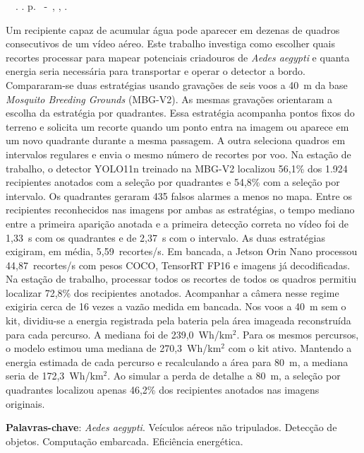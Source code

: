 \setlength{\absparsep}{18pt} %
\begin{resumo}
	\begin{flushleft}
			\setlength{\absparsep}{0pt} %
			\SingleSpacing
			\imprimirautorabr~~\textbf{\imprimirtituloresumo}.	\imprimirdata. \pageref{LastPage} p.
			\imprimirtipotrabalho~-~\imprimirinstituicao, \imprimirlocal, \imprimirdata.
 	\end{flushleft}
\OnehalfSpacing
Um recipiente capaz de acumular água pode aparecer em dezenas de quadros consecutivos de um vídeo aéreo. Este trabalho investiga como escolher quais recortes processar para mapear potenciais criadouros de \textit{Aedes aegypti} e quanta energia seria necessária para transportar e operar o detector a bordo. Compararam-se duas estratégias usando gravações de seis voos a 40~m da base \textit{Mosquito Breeding Grounds} (MBG-V2). As mesmas gravações orientaram a escolha da estratégia por quadrantes. Essa estratégia acompanha pontos fixos do terreno e solicita um recorte quando um ponto entra na imagem ou aparece em um novo quadrante durante a mesma passagem. A outra seleciona quadros em intervalos regulares e envia o mesmo número de recortes por voo. Na estação de trabalho, o detector YOLO11n treinado na MBG-V2 localizou 56,1\% dos 1.924 recipientes anotados com a seleção por quadrantes e 54,8\% com a seleção por intervalo. Os quadrantes geraram 435 falsos alarmes a menos no mapa. Entre os recipientes reconhecidos nas imagens por ambas as estratégias, o tempo mediano entre a primeira aparição anotada e a primeira detecção correta no vídeo foi de 1,33~s com os quadrantes e de 2,37~s com o intervalo. As duas estratégias exigiram, em média, 5,59~recortes/s. Em bancada, a Jetson Orin Nano processou 44,87~recortes/s com pesos COCO, TensorRT FP16 e imagens já decodificadas. Na estação de trabalho, processar todos os recortes de todos os quadros permitiu localizar 72,8\% dos recipientes anotados. Acompanhar a câmera nesse regime exigiria cerca de 16 vezes a vazão medida em bancada. Nos voos a 40~m sem o kit, dividiu-se a energia registrada pela bateria pela área imageada reconstruída para cada percurso. A mediana foi de 239,0~Wh/km$^2$. Para os mesmos percursos, o modelo estimou uma mediana de 270,3~Wh/km$^2$ com o kit ativo. Mantendo a energia estimada de cada percurso e recalculando a área para 80~m, a mediana seria de 172,3~Wh/km$^2$. Ao simular a perda de detalhe a 80~m, a seleção por quadrantes localizou apenas 46,2\% dos recipientes anotados nas imagens originais.

\textbf{Palavras-chave}: \textit{Aedes aegypti}. Veículos aéreos não tripulados. Detecção de objetos. Computação embarcada. Eficiência energética.
\end{resumo}
